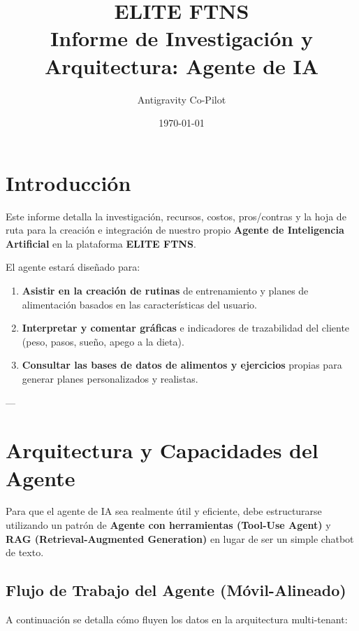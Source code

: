 \documentclass[11pt]{article}
\title{\textbf{\large ELITE FTNS \\ Informe de Investigación y Arquitectura: Agente de IA}}
\author{\small Antigravity Co-Pilot}
\date{\footnotesize \today}
\begin{document}
\maketitle

\section{Introducción}
Este informe detalla la investigación, recursos, costos, pros/contras y la hoja de ruta para la creación e integración de nuestro propio \textbf{Agente de Inteligencia Artificial} en la plataforma \textbf{ELITE FTNS}.

El agente estará diseñado para:
\begin{enumerate}
    \item \textbf{Asistir en la creación de rutinas} de entrenamiento y planes de alimentación basados en las características del usuario.
    \item \textbf{Interpretar y comentar gráficas} e indicadores de trazabilidad del cliente (peso, pasos, sueño, apego a la dieta).
    \item \textbf{Consultar las bases de datos de alimentos y ejercicios} propias para generar planes personalizados y realistas.
\end{enumerate}

---

\section{Arquitectura y Capacidades del Agente}
Para que el agente de IA sea realmente útil y eficiente, debe estructurarse utilizando un patrón de \textbf{Agente con herramientas (Tool-Use Agent)} y \textbf{RAG (Retrieval-Augmented Generation)} en lugar de ser un simple chatbot de texto.

\subsection{Flujo de Trabajo del Agente (Móvil-Alineado)}
A continuación se detalla cómo fluyen los datos en la arquitectura multi-tenant:
\end{document}
